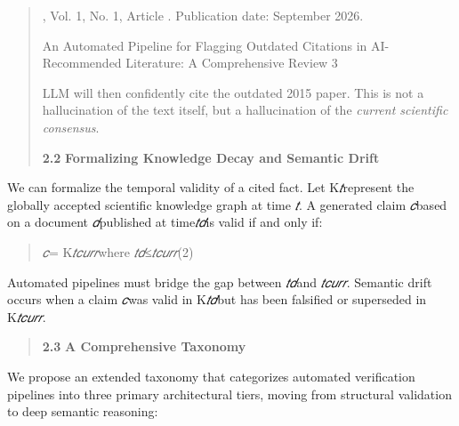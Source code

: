 \documentclass[
]{article}
\begin{document}
\begin{quote}
, Vol. 1, No. 1, Article . Publication date: September 2026.

An Automated Pipeline for Flagging Outdated Citations in AI-Recommended
Literature: A Comprehensive Review 3

LLM will then confidently cite the outdated 2015 paper. This is not a
hallucination of the text itself, but a hallucination of the
\emph{current scientific consensus}.

\textbf{2.2} \textbf{Formalizing Knowledge Decay and Semantic Drift}
\end{quote}

We can formalize the temporal validity of a cited fact. Let
K\emph{𝑡}represent the globally accepted scientific knowledge graph at
time \emph{𝑡}. A generated claim \emph{𝑐}based on a document
\emph{𝑑}published at time\emph{𝑡𝑑}is valid if and only if:

\begin{quote}
\emph{𝑐}\textbar= K\emph{𝑡𝑐𝑢𝑟𝑟}where \emph{𝑡𝑑}≤\emph{𝑡𝑐𝑢𝑟𝑟}(2)
\end{quote}

Automated pipelines must bridge the gap between \emph{𝑡𝑑}and
\emph{𝑡𝑐𝑢𝑟𝑟}. Semantic drift occurs when a claim \emph{𝑐}was valid in
K\emph{𝑡𝑑}but has been falsified or superseded in K\emph{𝑡𝑐𝑢𝑟𝑟}.

\begin{quote}
\textbf{2.3} \textbf{A Comprehensive Taxonomy}
\end{quote}

We propose an extended taxonomy that categorizes automated verification
pipelines into three primary architectural tiers, moving from structural
validation to deep semantic reasoning:
\end{document}
